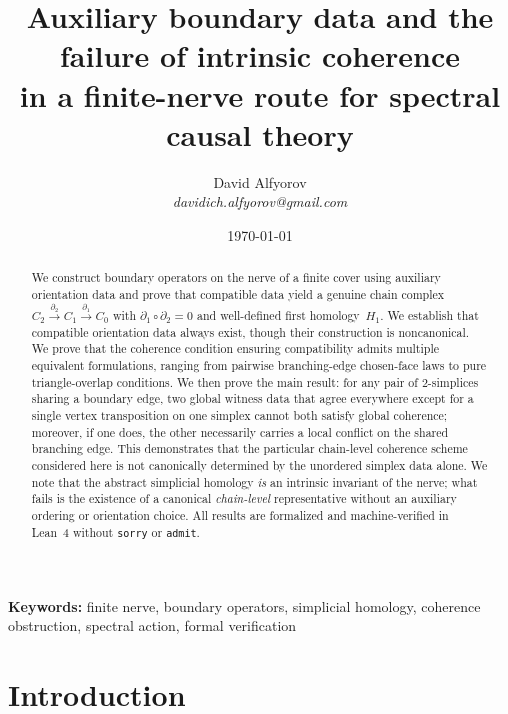 \documentclass[11pt,a4paper]{article}
\theoremstyle{plain}
\theoremstyle{definition}
\theoremstyle{remark}
\begin{document}
\title{Auxiliary boundary data and the failure of intrinsic coherence\\
  in a finite-nerve route for spectral causal theory}

\author{David Alfyorov\\[4pt]
  \small\textit{davidich.alfyorov@gmail.com}}

\date{\today}

\maketitle

\begin{abstract}
We construct boundary operators on the nerve of a finite cover using
auxiliary orientation data and prove that compatible data yield a genuine
chain complex $C_2 \xrightarrow{\partial_2} C_1 \xrightarrow{\partial_1} C_0$
with $\partial_1 \circ \partial_2 = 0$ and well-defined first homology~$H_1$.
We establish that compatible orientation data always exist, though their
construction is noncanonical. We prove that the coherence condition ensuring
compatibility admits multiple equivalent formulations, ranging from
pairwise branching-edge chosen-face laws to pure triangle-overlap conditions.
We then prove the main result: for any pair of $2$-simplices sharing a
boundary edge, two global witness data that agree everywhere except for a
single vertex transposition on one simplex cannot both satisfy global coherence;
moreover, if one does, the other necessarily carries a local conflict on the
shared branching edge. This demonstrates that the particular chain-level coherence scheme
considered here is not canonically determined by the unordered simplex
data alone. We note that the abstract simplicial homology \emph{is}
an intrinsic invariant of the nerve; what fails is the existence of
a canonical \emph{chain-level} representative without an auxiliary
ordering or orientation choice. All results are formalized and
machine-verified in Lean~4 without \texttt{sorry} or \texttt{admit}.
\end{abstract}

\medskip
\noindent\textbf{Keywords:} finite nerve, boundary operators, simplicial
homology, coherence obstruction, spectral action, formal verification

\tableofcontents

\section{Introduction}
\label{sec:intro}
\end{document}
